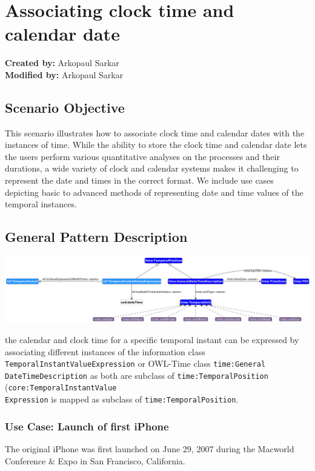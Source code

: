 \section{Associating clock time and calendar date}
\label{sec-change-location}

\textbf{Created by:} Arkopaul Sarkar \\
\textbf{Modified by:} Arkopaul Sarkar \\

\subsection*{Scenario Objective}

This scenario illustrates how to associate clock time and calendar dates with the instances of time. While the ability to store the clock time and calendar date lets the users perform various quantitative analyses on the processes and their durations, a wide variety of clock and calendar systems makes it challenging to represent the date and times in the correct format. We include use cases depicting basic to advanced methods of representing date and time values of the temporal instances.


\subsection*{General Pattern Description}

\includegraphics[scale=0.28]{scenarios/clock-time-calendar-date/images/general-clock-calendar.png}

the calendar and clock time for a specific temporal instant can be expressed by associating different instances of the information class \texttt{TemporalInstantValueExpression} or OWL-Time class \texttt{time:General\\DateTimeDescription} as both are subclass of \texttt{time:TemporalPosition} (\texttt{core:TemporalInstantValue\\Expression} is mapped as subclass of \texttt{time:TemporalPosition}.  

\subsubsection*{Use Case: Launch of first iPhone} 
The original iPhone was first launched on June 29, 2007 during the Macworld Conference \& Expo in San Francisco, California. 

